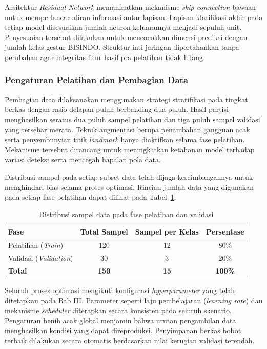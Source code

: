 Arsitektur \textit{Residual Network} memanfaatkan mekanisme \textit{skip connection} bawaan untuk memperlancar aliran informasi antar lapisan.
Lapisan klasifikasi akhir pada setiap model disesuaikan jumlah neuron keluarannya menjadi sepuluh unit.
Penyesuaian tersebut dilakukan untuk mencocokkan dimensi prediksi dengan jumlah kelas gestur BISINDO.
Struktur inti jaringan dipertahankan tanpa perubahan agar integritas fitur hasil pra pelatihan tidak hilang.

\subsubsection{Pengaturan Pelatihan dan Pembagian Data}
\label{subsubsec:pengaturan-pelatihan}

Pembagian data dilaksanakan menggunakan strategi stratifikasi pada tingkat berkas dengan rasio delapan puluh berbanding dua puluh.
Hasil partisi menghasilkan seratus dua puluh sampel pelatihan dan tiga puluh sampel validasi yang tersebar merata.
Teknik augmentasi berupa penambahan gangguan acak serta penyembunyian titik \textit{landmark} hanya diaktifkan selama fase pelatihan.
Mekanisme tersebut dirancang untuk meningkatkan ketahanan model terhadap variasi deteksi serta mencegah hapalan pola data.

Distribusi sampel pada setiap subset data telah dijaga keseimbangannya untuk menghindari bias selama proses optimasi.
Rincian jumlah data yang digunakan pada setiap fase pelatihan dapat dilihat pada Tabel~\ref{tab:4-distribusi-data}.

\begin{table}[H]
	\centering
	\caption{Distribusi sampel data pada fase pelatihan dan validasi}
	\label{tab:4-distribusi-data}
	\begin{tabular}{|l|c|c|c|}
	\hline
	\textbf{Fase} & \textbf{Total Sampel} & \textbf{Sampel per Kelas} & \textbf{Persentase} \\ \hline
	Pelatihan (\textit{Train})& 120 & 12 & 80\% \\ \hline
	Validasi (\textit{Validation})& 30 & 3 & 20\% \\ \hline
	\textbf{Total} & \textbf{150} & \textbf{15} & \textbf{100\%} \\ \hline
	\end{tabular}
\end{table}

Seluruh proses optimasi mengikuti konfigurasi \textit{hyperparameter} yang telah ditetapkan pada Bab III.
Parameter seperti laju pembelajaran (\textit{learning rate}) dan mekanisme \textit{scheduler} diterapkan secara konsisten pada seluruh skenario.
Pengaturan benih acak global menjamin bahwa urutan pengambilan data menghasilkan kondisi yang dapat direproduksi.
Penyimpanan berkas bobot terbaik dilakukan secara otomatis berdasarkan nilai kerugian validasi terendah.

